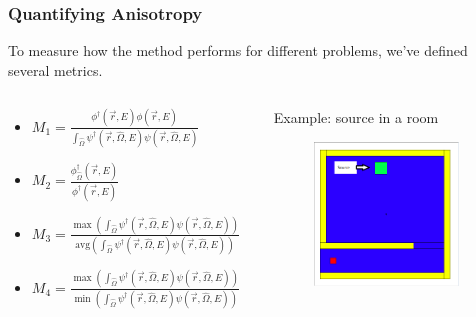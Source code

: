 \documentclass[xcolor=x11names,compress,handout]{beamer}
\renewcommand{\(}{\begin{columns}}
\renewcommand{\)}{\end{columns}}
\newcommand{\<}[1]{\begin{column}{#1}}
\renewcommand{\>}{\end{column}}
\newcommand{\vOmega}{\ensuremath{\hat{\Omega}}}
\newcommand{\vecr}{\vec{r}}
\begin{document}
\begin{frame}[fragile]

  \frametitle{Quantifying Anisotropy}
  
  To measure how the method performs for different problems, we've defined several metrics.
  \vspace*{1em}
    \begin{columns}
    \begin{column}{0.5\textwidth}
      \begin{itemize}
      \item $M_{1} = \frac{\phi^{\dagger}(\vecr,E)\phi(\vecr,E)}{\int_{\vOmega}\psi^{\dagger}(\vecr,\vOmega,E)\psi(\vecr,\vOmega,E)}$
      \item $M_{2} = \frac{\phi^{\dagger}_{\vOmega}(\vecr,E)}{\phi^{\dagger}(\vecr,E)}$
      \item $M_{3} = \frac{\max(\int_{\vOmega}\psi^{\dagger}(\vecr,\vOmega,E)\psi(\vecr,\vOmega,E))}{\text{avg}(\int_{\vOmega}\psi^{\dagger}(\vecr,\vOmega,E)\psi(\vecr,\vOmega,E))}$
       \item $M_{4} = \frac{\max(\int_{\vOmega}\psi^{\dagger}(\vecr,\vOmega,E)\psi(\vecr,\vOmega,E))}{\min(\int_{\vOmega}\psi^{\dagger}(\vecr,\vOmega,E)\psi(\vecr,\vOmega,E))}$
      \end{itemize}
    \end{column}    
    \begin{column}{0.5\textwidth}
    Example: source in a room
      	\begin{figure}
  	\begin{center}
  		\includegraphics[height=1.5in,clip]{../figs/therapy-room.png}
	\end{center}
  	\end{figure}
    \end{column}
  \end{columns}   

\end{frame}
\end{document}
